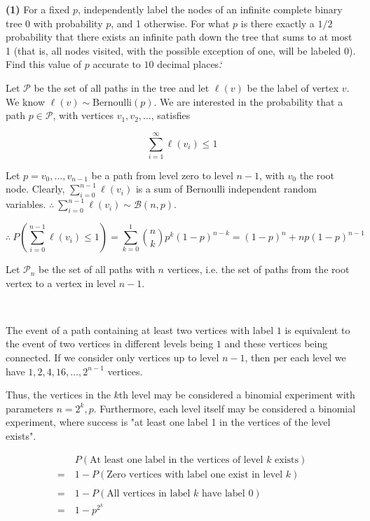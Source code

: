 \documentclass[a4paper, 12pt]{article}
\begin{document}
\begin{myframe}
\textbf{(1)} For a fixed $p$, independently label the nodes of an infinite
complete binary tree $0$ with probability $p$, and 1 otherwise. For what $p$ is
there exactly a $1/2$ probability that there exists an infinite path down the tree
that sums to at most 1 (that is, all nodes visited, with the possible exception
of one, will be labeled 0). Find this value of $p$ accurate to $10$ decimal places.`
\end{myframe}

Let $\mathcal{P}$ be the set of all paths in the tree and let $\ell(v)$ be the
label of vertex $v$. We know $\ell(v) \sim \text{Bernoulli}(p)$. We are
interested in the probability that a path
$p \in \mathcal{P}$, with vertices $v_1, v_2, \ldots$, satisfies 

\begin{equation*}
  \sum_{i=1}^\infty \ell(v_i) \leq 1
\end{equation*}

Let $p = v_0, \ldots, v_{n-1}$ be a path from level zero to level $n-1$, with
$v_0$ the root node. Clearly, $\sum_{i=0}^{n-1} \ell(v_i)$ is a sum of Bernoulli
independent random variables. $\therefore ~ \sum_{i=0}^{n-1} \ell(v_i) \sim
\mathcal{B}(n, p)$.

\begin{equation*}
  \therefore ~ P\left( \sum_{i = 0}^{n-1} \ell(v_i) \leq 1 \right) =
  \sum_{k=0}^1 \binom{n}{k}p^k(1-p)^{n-k} = (1-p)^{n} + np(1-p)^{n-1}
\end{equation*}

Let $\mathcal{P}_n$ be the set of all paths with $n$ vertices, i.e. the set of
paths from the root vertex to a vertex in level $n - 1$.

~ 

The event of a path containing at least two vertices with label $1$ is
equivalent to the event of two vertices in different levels being $1$ and these
vertices being connected. If we consider only vertices up to level $n-1$, then
per each level we have $1, 2, 4, 16, \ldots, 2^{n-1}$ vertices. 

Thus, the vertices in the $k$th level may be considered a binomial experiment
with parameters $n = 2^{k}, p$. Furthermore, each level itself may be considered
a binomial experiment, where success is "at least one label 1 in the vertices of
the level exists".

\begin{align*}
  &P(\text{At least one label in the vertices of level $k$ exists}) 
  \\=~& 1 - P(\text{Zero vertices with label one exist in level $k$}) \\ 
  \\=~& 1 - P(\text{All vertices in label $k$ have label 0}) \\ 
  = ~ &1- p^{2^k}
\end{align*}
\end{document}
